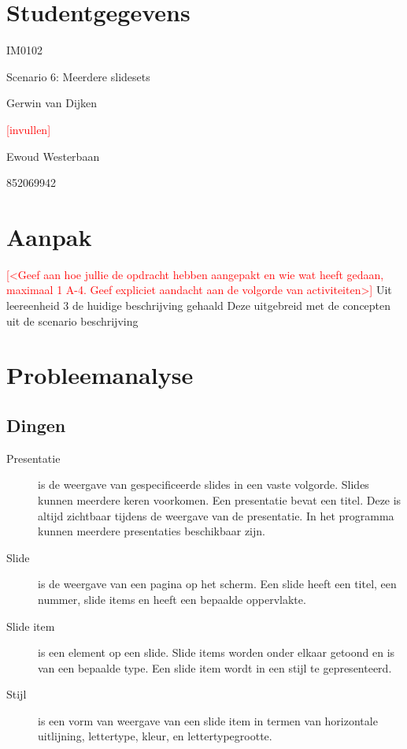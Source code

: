 \documentclass[a4paper]{article}
\newcommand{\todo}[1]{\textcolor{red}{[#1]}}
\begin{document}
\pagestyle{fancy}

\section*{Studentgegevens}
\begin{description}
	\item [Cursuscode] IM0102
	\item Scenario 6: Meerdere slidesets
	\item [Naam] Gerwin van Dijken
	\item [Studentnummer] \todo{invullen}
	\item [Naam] Ewoud Westerbaan
	\item [Studentnummer] 852069942
\end{description}

\section*{Aanpak}
\todo{<Geef aan hoe jullie de opdracht hebben aangepakt en wie wat heeft gedaan, maximaal 1 A-4. Geef expliciet aandacht aan de volgorde van activiteiten>}
Uit leereenheid 3 de huidige beschrijving gehaald
Deze uitgebreid met de concepten uit de scenario beschrijving



\section{Probleemanalyse}
\subsection{Dingen}
\begin{description}
\item[Presentatie] is de weergave van gespecificeerde slides in een vaste volgorde. Slides kunnen meerdere keren voorkomen. Een presentatie bevat een titel. Deze is altijd zichtbaar tijdens de weergave van de presentatie. In het programma kunnen meerdere presentaties beschikbaar zijn.
\item[Slide] is de weergave van een pagina op het scherm. Een slide heeft een titel, een nummer, slide items en heeft een bepaalde oppervlakte.
\item[Slide item] is een element op een slide. Slide items worden onder elkaar getoond en is van een bepaalde type.
Een slide item wordt in een stijl te gepresenteerd.
\item[Stijl] is een vorm van weergave van een slide item in termen van horizontale uitlijning, lettertype, kleur, en lettertypegrootte.
\end{description}
\end{document}
